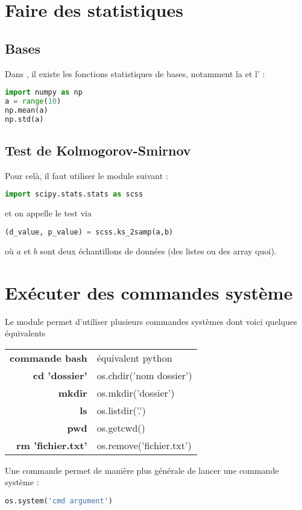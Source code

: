 \documentclass[a4paper,twoside]{article}
\begin{document}
\section{Faire des statistiques}
\subsection{Bases}
Dans , il existe les fonctions statistiques de bases, notamment la  et l' :
\begin{lstlisting}[language=python]
import numpy as np
a = range(10)
np.mean(a)
np.std(a)
\end{lstlisting}



\subsection{Test de Kolmogorov-Smirnov}
Pour celà, il faut utiliser le module suivant :
\begin{lstlisting}[language=python]
import scipy.stats.stats as scss
\end{lstlisting}
et on appelle le test via
\begin{lstlisting}[language=python]
(d_value, p_value) = scss.ks_2samp(a,b)
\end{lstlisting}
où $a$ et $b$ sont deux échantillons de données (des listes ou des array quoi).





\section{Exécuter des commandes système}
Le module  permet d'utiliser plusieurs commandes systèmes dont voici quelques équivalents

\begin{tabular}{>{\bfseries}r<{}@{ : }p{11cm}}
commande bash & équivalent python\\
cd 'dossier' & os.chdir('nom dossier')\\
mkdir & os.mkdir('dossier')\\
ls & os.listdir('.')\\
pwd & os.getcwd()\\
rm 'fichier.txt' & os.remove('fichier.txt')
\end{tabular}

Une commande permet de manière plus générale de lancer une commande système :
\begin{lstlisting}[language=python]
os.system('cmd argument')
\end{lstlisting}
\end{document}

